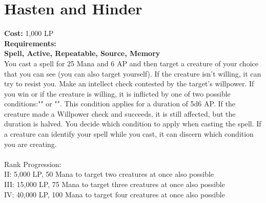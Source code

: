 \section{Hasten and Hinder}\label{spell:hastenHinder}
\textbf{Cost:} 1,000 LP\\
\textbf{Requirements:}\\
\textbf{Spell, Active, Repeatable, Source, Memory}\\
You cast a spell for 25 Mana and 6 AP and then target a creature of your choice that you can see (you can also target yourself).
If the creature isn't willing, it can try to resist you.
Make an intellect check contested by the target's willpower.
If you win or if the creature is willing, it is inflicted by one of two possible conditions:"" or "".
This condition applies for a duration of 5d6 AP.
If the creature made a Willpower check and succeeds, it is still affected, but the duration is halved.
You decide which condition to apply when casting the spell.
If a creature can identify your spell while you cast, it can discern which condition you are creating.\\
\\
Rank Progression:\\
II: 5,000 LP, 50 Mana to target two creatures at once also possible\\
III: 15,000 LP, 75 Mana to target three creatures at once also possible\\
IV: 40,000 LP, 100 Mana to target four creatures at once also possible \\
